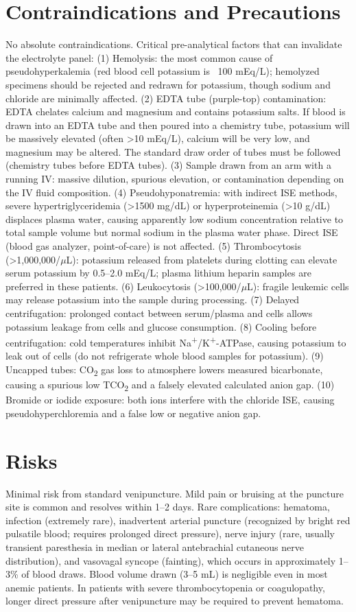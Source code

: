 \section*{Contraindications and Precautions}
No absolute contraindications. Critical pre-analytical factors that can invalidate the electrolyte panel: (1) Hemolysis: the most common cause of pseudohyperkalemia (red blood cell potassium is ~100 mEq/L); hemolyzed specimens should be rejected and redrawn for potassium, though sodium and chloride are minimally affected. (2) EDTA tube (purple-top) contamination: EDTA chelates calcium and magnesium and contains potassium salts. If blood is drawn into an EDTA tube and then poured into a chemistry tube, potassium will be massively elevated (often >10 mEq/L), calcium will be very low, and magnesium may be altered. The standard draw order of tubes must be followed (chemistry tubes before EDTA tubes). (3) Sample drawn from an arm with a running IV: massive dilution, spurious elevation, or contamination depending on the IV fluid composition. (4) Pseudohyponatremia: with indirect ISE methods, severe hypertriglyceridemia (>1500 mg/dL) or hyperproteinemia (>10 g/dL) displaces plasma water, causing apparently low sodium concentration relative to total sample volume but normal sodium in the plasma water phase. Direct ISE (blood gas analyzer, point-of-care) is not affected. (5) Thrombocytosis (>1,000,000/$\mu$L): potassium released from platelets during clotting can elevate serum potassium by 0.5--2.0 mEq/L; plasma lithium heparin samples are preferred in these patients. (6) Leukocytosis (>100,000/$\mu$L): fragile leukemic cells may release potassium into the sample during processing. (7) Delayed centrifugation: prolonged contact between serum/plasma and cells allows potassium leakage from cells and glucose consumption. (8) Cooling before centrifugation: cold temperatures inhibit Na\textsuperscript{+}/K\textsuperscript{+}-ATPase, causing potassium to leak out of cells (do not refrigerate whole blood samples for potassium). (9) Uncapped tubes: CO\textsubscript{2} gas loss to atmosphere lowers measured bicarbonate, causing a spurious low TCO\textsubscript{2} and a falsely elevated calculated anion gap. (10) Bromide or iodide exposure: both ions interfere with the chloride ISE, causing pseudohyperchloremia and a false low or negative anion gap.

\section*{Risks}
Minimal risk from standard venipuncture. Mild pain or bruising at the puncture site is common and resolves within 1--2 days. Rare complications: hematoma, infection (extremely rare), inadvertent arterial puncture (recognized by bright red pulsatile blood; requires prolonged direct pressure), nerve injury (rare, usually transient paresthesia in median or lateral antebrachial cutaneous nerve distribution), and vasovagal syncope (fainting), which occurs in approximately 1--3\% of blood draws. Blood volume drawn (3--5 mL) is negligible even in most anemic patients. In patients with severe thrombocytopenia or coagulopathy, longer direct pressure after venipuncture may be required to prevent hematoma.


